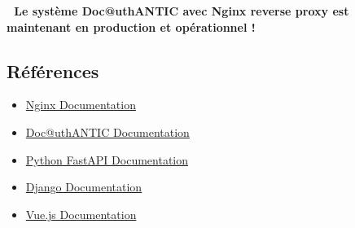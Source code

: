 \documentclass[12pt,a4paper]{article}
\begin{document}
\textbf{🎉 Le système Doc@uthANTIC avec Nginx reverse proxy est maintenant en production et opérationnel !}

\subsection{Références}

\begin{itemize}[leftmargin=*]
    \item \href{https://nginx.org/en/docs/}{Nginx Documentation}
    \item \href{https://certisign.readthedocs.io/}{Doc@uthANTIC Documentation}
    \item \href{https://fastapi.tiangolo.com/}{Python FastAPI Documentation}
    \item \href{https://docs.djangoproject.com/}{Django Documentation}
    \item \href{https://vuejs.org/guide/}{Vue.js Documentation}
\end{itemize}
\end{document}
